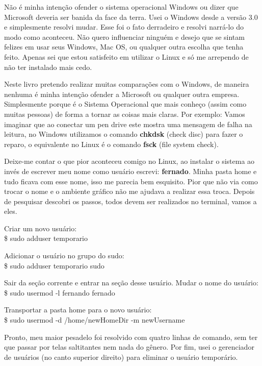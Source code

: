 Não é minha intenção ofender o sistema operacional Windows ou dizer que Microsoft deveria ser banida da face da terra. Usei o Windows desde a versão 3.0 e simplesmente resolvi mudar. Esse foi o fato derradeiro e resolvi narrá-lo do modo como aconteceu. Não quero influenciar ninguém e desejo que se sintam felizes em usar seus Windows, Mac OS, ou qualquer outra escolha que tenha feito. Apenas sei que estou satisfeito em utilizar o Linux e só me arrependo de não ter instalado mais cedo.
\\[3mm]
\begin{dica}
 Neste livro pretendo realizar muitas comparações com o Windows, de maneira nenhuma é minha intenção ofender a Microsoft ou qualquer outra empresa. Simplesmente porque é o Sistema Operacional que mais conheço (assim como muitas pessoas) de forma a tornar as coisas mais claras. Por exemplo: Vamos imaginar que ao conectar um pen drive este mostra uma mensagem de falha na leitura, no Windows utilizamos o comando \textbf{chkdsk} (check disc) para fazer o reparo, o equivalente no Linux é o comando \textbf{fsck} (file system check).
\end{dica}

Deixe-me contar o que pior aconteceu comigo no Linux, ao instalar o sistema ao invés de escrever meu nome como usuário escrevi: \textbf{fernado}. Minha pasta home e tudo ficava com esse nome, isso me parecia bem esquisito. Pior que não via como trocar o nome e o ambiente gráfico não me ajudava a realizar essa troca. Depois de pesquisar descobri os passos, todos devem ser realizados no terminal, vamos a eles.

Criar um novo usuário: \\
{\ttfamily\$ sudo adduser temporario}

Adicionar o usuário no grupo do sudo: \\
{\ttfamily\$ sudo adduser temporario sudo}

Sair da seção corrente e entrar na seção desse usuário. Mudar o nome do usuário: \\
{\ttfamily\$ sudo usermod -l fernando fernado}

Transportar a pasta home para o novo usuário: \\
{\ttfamily\$ sudo usermod -d /home/newHomeDir -m newUsername}

Pronto, meu maior pesadelo foi resolvido com quatro linhas de comando, sem ter que passar por telas saltitantes nem nada do gênero. Por fim, usei o gerenciador de usuários (no canto superior direito) para eliminar o usuário temporário.

